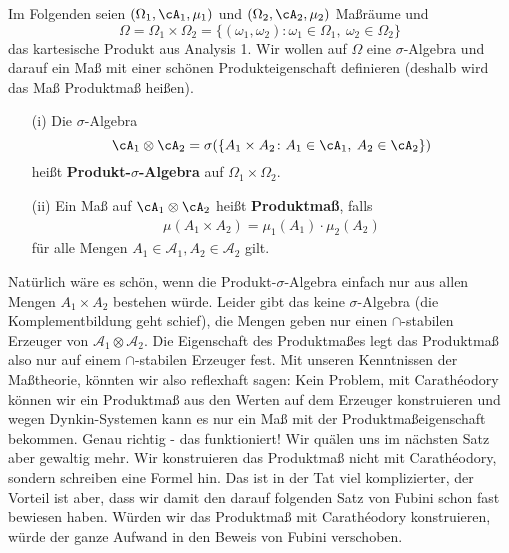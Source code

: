 Im Folgenden seien $(\Omega_1, \cA_1, \mu_1)$ und $(\Omega_2, \cA_2, \mu_2)$ Maßräume und $$\Omega = \Omega_1 \times \Omega_2 = \{ (\omega_1, \omega_2)\colon \omega_1 \in \Omega_1, \: \omega_2 \in \Omega_2 \}$$ das kartesische Produkt aus Analysis 1. Wir wollen auf $\Omega$ eine $\sigma$-Algebra und darauf ein Ma\ss{} mit einer sch\"onen Produkteigenschaft definieren (deshalb wird das Ma\ss{} Produktma\ss{} hei\ss en).
\begin{deff}\label{pm}
	\begin{enumerate}[label=(\alph*)]
		\item[(i)] Die $\sigma$-Algebra $$\cA_1 \otimes \cA_2 = \sigma(\{ A_1\times A_2 \colon A_1 \in \cA_1, \: A_2 \in \cA_2 \})$$ heißt \textbf{Produkt-$\sigma$-Algebra} auf $ \Omega_1 \times \Omega_2 $. 
		\item[(ii)] Ein Maß auf $ \cA_1 \otimes \cA_2 $ heißt \textbf{Produktmaß}, falls 
		\begin{align}\label{Produktformel}
		 \mu(A_1\times A_2) = \mu_1(A_1) \cdot \mu_2(A_2)
		 \end{align}
		f\"ur alle Mengen $A_1\in \mathcal A_1, A_2\in \mathcal A_2$ gilt.
	\end{enumerate}
\end{deff}
Nat\"urlich w\"are es sch\"on, wenn die Produkt-$\sigma$-Algebra einfach nur aus allen Mengen $A_1\times A_2$ bestehen w\"urde. Leider gibt das keine $\sigma$-Algebra (die Komplementbildung geht schief), die Mengen geben nur einen $\cap$-stabilen Erzeuger von $\mathcal A_1\otimes \mathcal A_2$. Die Eigenschaft des Produktma\ss es legt das Produktma\ss{} also nur auf einem $\cap$-stabilen Erzeuger fest. Mit unseren Kenntnissen der Ma\ss theorie, k\"onnten wir also reflexhaft sagen: Kein Problem, mit Carath\'eodory k\"onnen wir ein Produktma\ss{} aus den Werten auf dem Erzeuger konstruieren und wegen Dynkin-Systemen kann es nur ein Ma\ss{} mit der Produktma\ss eigenschaft bekommen. Genau richtig - das funktioniert! Wir qu\"alen uns im n\"achsten Satz aber gewaltig mehr. Wir konstruieren das Produktma\ss{} nicht mit Carath\'eodory, sondern schreiben eine Formel hin. Das ist in der Tat viel komplizierter, der Vorteil ist aber, dass wir damit den darauf folgenden Satz von Fubini schon fast bewiesen haben. W\"urden wir das Produktma\ss{} mit Carath\'eodory konstruieren, w\"urde der ganze Aufwand in den Beweis von Fubini verschoben.




